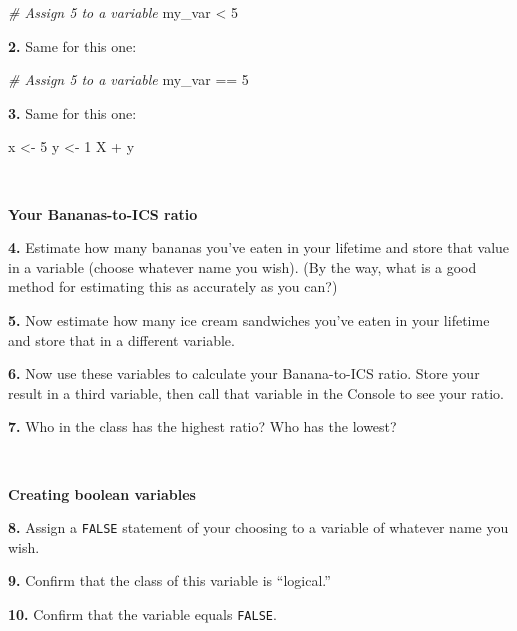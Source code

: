 \documentclass[
]{book}
\newenvironment{Shaded}{\begin{snugshade}}{\end{snugshade}}
\newcommand{\CommentTok}[1]{\textcolor[rgb]{0.56,0.35,0.01}{\textit{#1}}}
\newcommand{\DecValTok}[1]{\textcolor[rgb]{0.00,0.00,0.81}{#1}}
\newcommand{\NormalTok}[1]{#1}
\newcommand{\OtherTok}[1]{\textcolor[rgb]{0.56,0.35,0.01}{#1}}
\newcommand{\SpecialCharTok}[1]{\textcolor[rgb]{0.00,0.00,0.00}{#1}}
\begin{document}
\begin{Shaded}
\begin{Highlighting}[]
\CommentTok{\# Assign 5 to a variable}
\NormalTok{my\_var }\SpecialCharTok{\textless{}} \DecValTok{5}
\end{Highlighting}
\end{Shaded}

\textbf{2.} Same for this one:

\begin{Shaded}
\begin{Highlighting}[]
\CommentTok{\# Assign 5 to a variable}
\NormalTok{my\_var }\SpecialCharTok{==} \DecValTok{5}
\end{Highlighting}
\end{Shaded}

\textbf{3.} Same for this one:

\begin{Shaded}
\begin{Highlighting}[]
\NormalTok{x }\OtherTok{\textless{}{-}} \DecValTok{5}
\NormalTok{y }\OtherTok{\textless{}{-}} \DecValTok{1}
\NormalTok{X }\SpecialCharTok{+}\NormalTok{ y}
\end{Highlighting}
\end{Shaded}

~

\textbf{Your Bananas-to-ICS ratio}

\textbf{4.} Estimate how many bananas you've eaten in your lifetime and store that value in a variable (choose whatever name you wish). (By the way, what is a good method for estimating this as accurately as you can?)

\textbf{5.} Now estimate how many ice cream sandwiches you've eaten in your lifetime and store that in a different variable.

\textbf{6.} Now use these variables to calculate your Banana-to-ICS ratio. Store your result in a third variable, then call that variable in the Console to see your ratio.

\textbf{7.} Who in the class has the highest ratio? Who has the lowest?

~

\textbf{Creating boolean variables}

\textbf{8.} Assign a \texttt{FALSE} statement of your choosing to a variable of whatever name you wish.

\textbf{9.} Confirm that the class of this variable is ``logical.''

\textbf{10.} Confirm that the variable equals \texttt{FALSE}.
\end{document}
